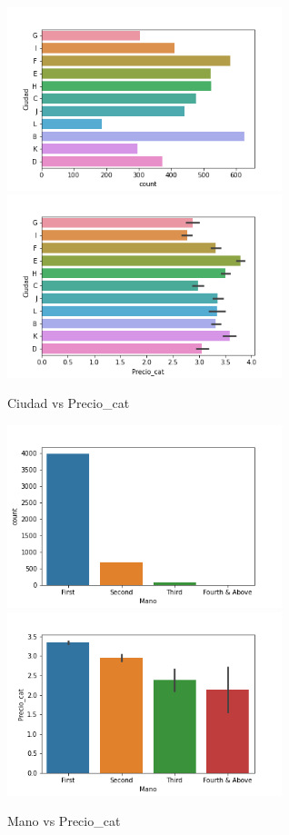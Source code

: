 \documentclass[12pt,twoside]{report}
\begin{document}
\begin{figure}[H]
\begin{multicols}{2}
\includegraphics[width=8cm]{../notebooks/figures/ciudad.png}
\columnbreak
\includegraphics[width=8cm]{../notebooks/figures/ciudad_precio_cat.png}
\end{multicols}
\caption{Ciudad vs Precio\_cat}

\begin{multicols}{2}
\includegraphics[width=8cm]{../notebooks/figures/mano.png}
\columnbreak
\includegraphics[width=8cm]{../notebooks/figures/mano_precio_cat.png}
\end{multicols}
\caption{Mano vs Precio\_cat}


\end{figure}
\end{document}
